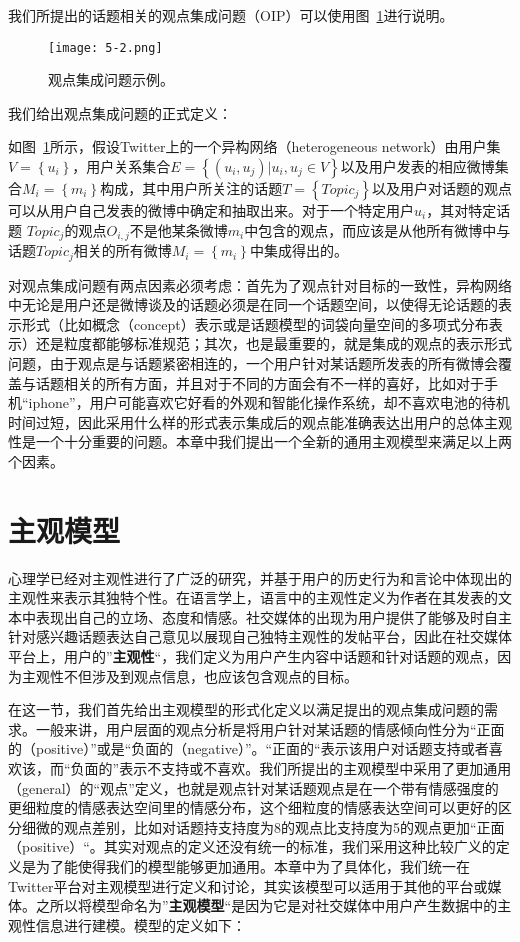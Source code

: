 我们所提出的话题相关的观点集成问题（OIP）可以使用图~\ref{fig5-2}进行说明。
\begin{figure}[htb]
\centering
\texttt{[image: 5-2.png]}
\caption{观点集成问题示例。}
\label{fig5-2}
\end{figure}

我们给出观点集成问题的正式定义：

\begin{definition}[观点集成问题]
如图~\ref{fig5-2}所示，假设Twitter上的一个异构网络（heterogeneous network）由用户集$ V=\left\{ u_{i} \right\} $，用户关系集合$ E=\left\{(u_{i},u_{j})| u_{i},u_{j} \in V\right\} $以及用户发表的相应微博集合$ M_{i}=\left\{ m_{i} \right\} $构成，其中用户所关注的话题$ T=\left\{ Topic_{j} \right\} $以及用户对话题的观点可以从用户自己发表的微博中确定和抽取出来。对于一个特定用户$ u_{i} $，其对特定话题 $ Topic_{j} $的观点$ O_{i,j} $不是他某条微博$ m_{i} $中包含的观点，而应该是从他所有微博中与话题$ Topic_{j} $相关的所有微博$ M_{i}=\left\{ m_{i} \right\} $中集成得出的。
\end{definition}

对观点集成问题有两点因素必须考虑：首先为了观点针对目标的一致性，异构网络中无论是用户还是微博谈及的话题必须是在同一个话题空间，以使得无论话题的表示形式（比如概念（concept）表示或是话题模型的词袋向量空间的多项式分布表示）还是粒度都能够标准规范；其次，也是最重要的，就是集成的观点的表示形式问题，由于观点是与话题紧密相连的，一个用户针对某话题所发表的所有微博会覆盖与话题相关的所有方面，并且对于不同的方面会有不一样的喜好，比如对于手机“iphone”，用户可能喜欢它好看的外观和智能化操作系统，却不喜欢电池的待机时间过短，因此采用什么样的形式表示集成后的观点能准确表达出用户的总体主观性是一个十分重要的问题。本章中我们提出一个全新的通用主观模型来满足以上两个因素。

\section{主观模型}
\label{sec4}
心理学已经对主观性进行了广泛的研究，并基于用户的历史行为和言论中体现出的主观性来表示其独特个性。在语言学上，语言中的主观性定义为作者在其发表的文本中表现出自己的立场、态度和情感。社交媒体的出现为用户提供了能够及时自主针对感兴趣话题表达自己意见以展现自己独特主观性的发帖平台，因此在社交媒体平台上，用户的”\textbf{主观性}“，我们定义为用户产生内容中话题和针对话题的观点，因为主观性不但涉及到观点信息，也应该包含观点的目标。

在这一节，我们首先给出主观模型的形式化定义以满足提出的观点集成问题的需求。一般来讲，用户层面的观点分析是将用户针对某话题的情感倾向性分为“正面的（positive）”或是“负面的（negative）”。“正面的“表示该用户对话题支持或者喜欢该，而“负面的”表示不支持或不喜欢。我们所提出的主观模型中采用了更加通用（general）的“观点”定义，也就是观点针对某话题观点是在一个带有情感强度的更细粒度的情感表达空间里的情感分布，这个细粒度的情感表达空间可以更好的区分细微的观点差别，比如对话题持支持度为8的观点比支持度为5的观点更加“正面（positive）“。其实对观点的定义还没有统一的标准，我们采用这种比较广义的定义是为了能使得我们的模型能够更加通用。本章中为了具体化，我们统一在Twitter平台对主观模型进行定义和讨论，其实该模型可以适用于其他的平台或媒体。之所以将模型命名为”\textbf{主观模型}“是因为它是对社交媒体中用户产生数据中的主观性信息进行建模。模型的定义如下：

